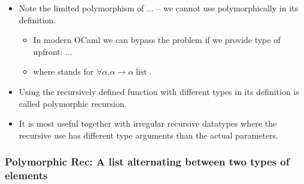 \documentclass{beamer}
\newcommand{\tmop}[1]{\ensuremath{\operatorname{#1}}}
\newcommand{\tmverbatim}[1]{\text{{\ttfamily{#1}}}}
\begin{document}
\begin{itemize}
  \item Note the limited polymorphism of {}{}{\hlopt{=}} ... -- we cannot use \tmverbatim{f} polymorphically in its
  definition.
  \begin{itemize}
    \item In modern OCaml we can bypass the problem if we provide type of
    \tmverbatim{f} upfront: {}{}{\hlopt{:
    }}{}{}{}{\hlopt{-> }}{}{\hlopt{ =}} ...
    
    \item where {}{}{}{\hlopt{-> }}{} stands for $\forall \alpha . \alpha \rightarrow \alpha
    \tmop{list}$.
  \end{itemize}
  \item Using the recursively defined function with different types in its
  definition is called polymorphic recursion.
  
  \item It is most useful together with irregular recursive datatypes where
  the recursive use has different type arguments than the actual parameters.
\end{itemize}

\subsubsection{Polymorphic Rec: A list alternating between two types of
elements}
\end{document}
